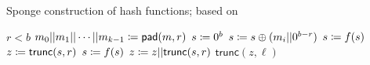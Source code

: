 \begin{algorithm}[p]
\caption{Sponge construction of hash functions;
    based on~\cite[Alg.~1]{KeccakSponge2011}}
\label{alg:sponge_construction}
\begin{algorithmic}[1]
\Require $r < b$
    \State $m_{0}||m_{1}||\cdots||m_{k-1} \coloneqq{} \textsf{pad}(m, r)$
    \State $s \coloneqq{} 0^{b}$
        \State $s \coloneqq{} s \oplus (m_{i}||0^{b-r})$
        \State $s \coloneqq{} f(s)$
    \EndFor
    \State $z \coloneqq{} \textsf{trunc}(s, r)$
        \State $s \coloneqq{} f(s)$
        \State $z \coloneqq{} z||\textsf{trunc}(s, r)$
    \EndWhile
    \State \Return $\textsf{trunc}(z, \ell)$
\EndProcedure
\end{algorithmic}
\end{algorithm}
